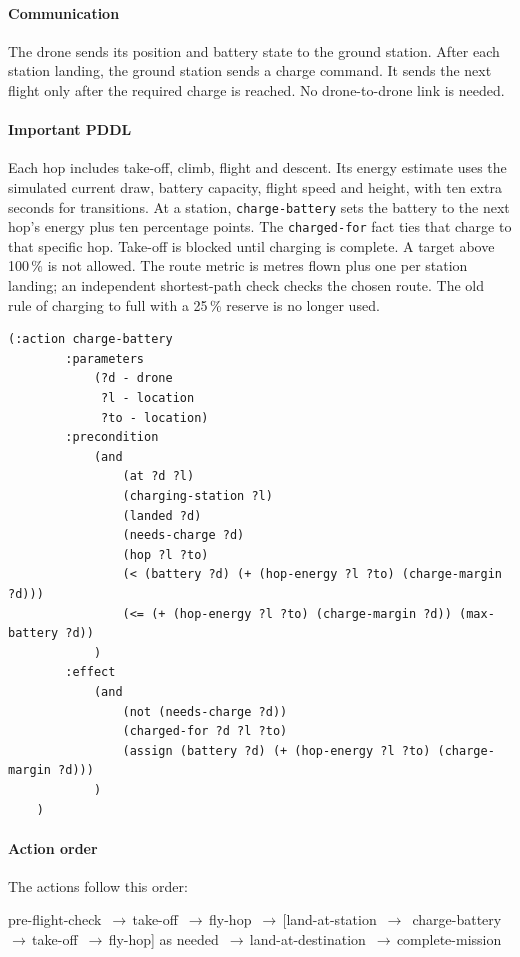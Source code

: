 \documentclass[11pt,a4paper,oneside]{report}
\newcommand{\code}[1]{\texttt{#1}}
\newcommand{\then}{\,{\color{amber!80!black}$\boldsymbol{\rightarrow}$}\allowbreak\,}
\newcommand{\actionflow}[1]{%
  \par\begin{tcolorbox}[colback=codebg,colframe=coderule,boxrule=0.4pt,arc=2pt,
      left=5pt,right=5pt,top=2pt,bottom=2pt,before skip=6pt,after skip=8pt]
    \footnotesize\ttfamily\raggedright\setstretch{1.25}#1
  \end{tcolorbox}}
\begin{document}
\paragraph{Communication}
The drone sends its position and battery state to the ground station. After each station
landing, the ground station sends a charge command. It sends the next flight only after the
required charge is reached. No drone-to-drone link is needed.

\paragraph{Important PDDL}
Each hop includes take-off, climb, flight and descent. Its energy estimate uses the simulated
current draw, battery capacity, flight speed and height, with ten extra seconds for transitions.
At a station, \code{charge-battery} sets the battery to the next hop's energy plus ten percentage
points. The \code{charged-for} fact ties that charge to that specific hop. Take-off is blocked
until charging is complete. A target above 100\,\% is not allowed. The route metric is metres
flown plus one per station landing; an independent shortest-path check checks the chosen route.
The old rule of charging to full with a 25\,\% reserve is no longer used.

\begin{lstlisting}
(:action charge-battery
        :parameters
            (?d - drone
             ?l - location
             ?to - location)
        :precondition
            (and
                (at ?d ?l)
                (charging-station ?l)
                (landed ?d)
                (needs-charge ?d)
                (hop ?l ?to)
                (< (battery ?d) (+ (hop-energy ?l ?to) (charge-margin ?d)))
                (<= (+ (hop-energy ?l ?to) (charge-margin ?d)) (max-battery ?d))
            )
        :effect
            (and
                (not (needs-charge ?d))
                (charged-for ?d ?l ?to)
                (assign (battery ?d) (+ (hop-energy ?l ?to) (charge-margin ?d)))
            )
    )
\end{lstlisting}

\paragraph{Action order} The actions follow this order:
\actionflow{pre-flight-check \then take-off \then fly-hop \then [land-at-station \then
charge-battery \then take-off \then fly-hop] as needed \then land-at-destination \then complete-mission}
\end{document}
